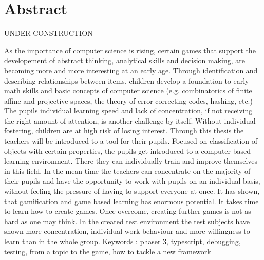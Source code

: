 
\chapter*{Abstract}
UNDER CONSTRUCTION

As the importance of computer science is rising, certain games that support the
developement of abstract thinking, analytical skills and decision making, are
becoming more and more interesting at an early age. Through identification and
describing relationships between items, children develop a foundation to early
math skills and basic concepts of computer science (e.g. combinatorics of finite
affine and projective spaces, the theory of error-correcting codes, hashing, etc.)
The pupils individual learning speed and lack of concentration, if
not receiving the right amount of attention, is another challenge by itself.
Without individual fostering, children are at high risk of losing interest.
Through this thesis the teachers will be introduced to a tool for their pupils.
Focused on classification of objects with certain properties, the pupils get
introduced to a computer-based learning environment. There they can individually
train and improve themselves in this field. In the mean time the teachers can
concentrate on the majority of their pupils and have the opportunity to work with
pupils on an individual basis, without feeling the pressure of having to support
everyone at once.
It has shown, that gamification and game based learning has enormous potential.
It takes time to learn how to create games. Once overcome, creating further games
is not as hard as one may think. In the created test environment the test subjects
have shown more concentration, individual work behaviour and more willingness to
learn than in the whole group.
Keywords : phaser 3, typescript, debugging, testing, from a topic to the game, how to tackle a new framework
